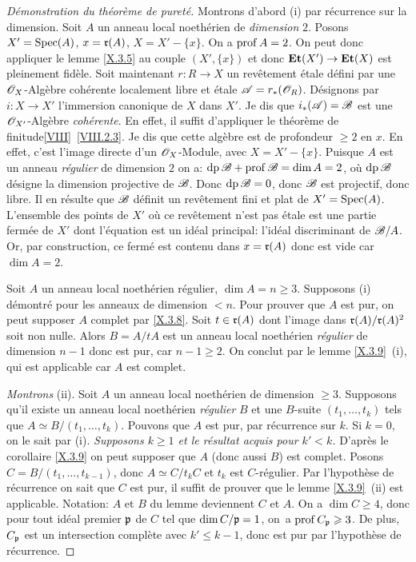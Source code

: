 \begin{proof}[D\'emonstration du th\'eor\`eme de puret\'e]
Montrons d'abord (i) par r\'ecurrence sur la dimension. Soit $A$ un anneau local noeth\'erien de \emph{dimension} $2$. Posons $X'=\operatorname{Spec}(A)$, $x=\mathfrak{r}(A)$, $X=X'-\{x\}$. On a $\operatorname{prof} A=2$. On peut donc appliquer le lemme \ref{X.3.5} au couple $(X', \{x\})$ et donc $\Et(X')\to\Et(X)$ est pleinement fid\`ele. Soit maintenant $r\colon R\to X$ un rev\^etement \'etale d\'efini par une $\mathscr{O}_X$-Alg\`ebre coh\'erente localement libre et \'etale ${\mathscr A}=r_\ast({\mathscr O}_R)$. D\'esignons par $i\colon X\to X'$ l'immersion canonique de $X$ dans $X'$. Je dis que $i_\ast({\mathscr A})={\mathscr B}$ est une ${\mathscr O}_{X'}$-Alg\`ebre \emph{cohérente}. En effet, il suffit d'appliquer le \og th\'eor\`eme de finitude\fg \ref{VIII}~\ref{VIII.2.3}. Je dis que cette alg\`ebre est de profondeur $\geq 2$ en $x$. En effet, c'est l'image directe d'un $\mathscr{O}_X$-Module, avec $X=X'-\{x\}$. Puisque $A$ est un anneau \emph{régulier} de dimension $2$ on a: $\operatorname{dp} {\mathscr B} + \operatorname{prof}{\mathscr B}=\dim A=2$, o\`u $\operatorname{dp}{\mathscr B}$ d\'esigne la dimension projective de ${\mathscr B}$. Donc $\operatorname{dp}{\mathscr B}=0$, donc ${\mathscr B}$ est projectif, donc libre. Il en r\'esulte que ${\mathscr B}$ d\'efinit un rev\^etement fini et plat de $X'=\operatorname{Spec}(A)$. L'ensemble des points de $X'$ o\`u ce rev\^etement n'est pas \'etale est une partie ferm\'ee de $X'$ dont l'\'equation est un id\'eal principal: l'id\'eal discriminant de ${\mathscr B}/A$. Or, par construction, ce ferm\'e est contenu dans $x=\mathfrak{r}(A)$ donc est vide car $\dim A=2$.

Soit $A$ un anneau local noeth\'erien r\'egulier, $\dim A=n\geq3$. Supposons (i) d\'emontr\'e pour les anneaux de dimension $<n$. Pour prouver que $A$ est pur, on peut supposer $A$ complet par \ref{X.3.8}. Soit $t\in\mathfrak{r}(A)$ dont l'image dans $\mathfrak{r}(A)/\mathfrak{r}(A)^2$ soit non nulle. Alors $B=A/tA$ est un anneau local noeth\'erien \emph{régulier} de dimension $n-1$ donc est pur, car $n-1\geq2$. On conclut par le lemme \ref{X.3.9}~(i), qui est applicable car $A$ est complet.

\emph{Montrons} (ii). Soit $A$ un anneau local noeth\'erien de dimension $\geq 3$. Supposons qu'il existe un anneau local noeth\'erien \emph{régulier} $B$ et une $B$-suite $(t_1, \ldots, t_k)$ tels que $A\simeq B/(t_1, \ldots, t_k)$. Pouvons que $A$ est pur, par r\'ecurrence sur $k$. Si $k=0$, on le sait par (i). \emph{Supposons $k\geq1$ et le résultat acquis pour $k'<k$.} D'apr\`es le corollaire \ref{X.3.9} on peut supposer que $A$ (donc aussi $B$) est complet. Posons $C=B/(t_1, \ldots, t_{k-1})$, donc $A\simeq C/t_kC$ et $t_k$ est $C$-r\'egulier. Par l'hypoth\`ese de r\'ecurrence on sait que $C$ est pur, il suffit de prouver que le lemme \ref{X.3.9}~(ii) est applicable. Notation: $A$ et $B$ du lemme deviennent $C$ et $A$. On a $\dim C\geq4$, donc pour tout id\'eal premier $\mathfrak{p}$ de $C$ tel que $\dim C/\mathfrak{p}=1$, on~a $\operatorname{prof} C_{\mathfrak{p}}\geqslant3$. De plus, $C_{\mathfrak{p}}$ est un intersection compl\`ete avec $k'\leq k-1$, donc est pur par l'hypoth\`ese de r\'ecurrence.
\end{proof}

